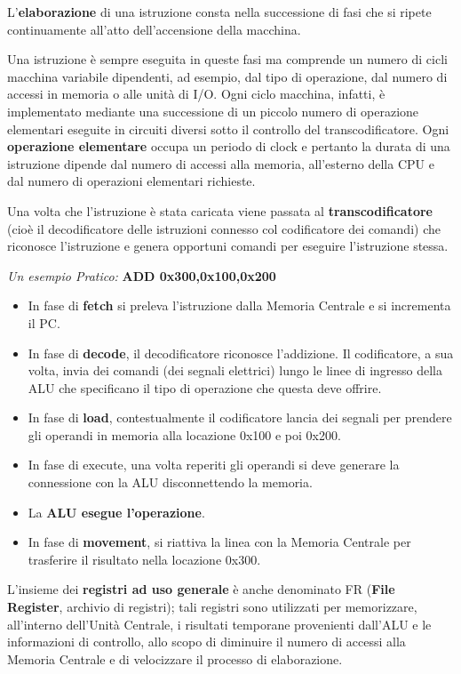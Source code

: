 \documentclass[12pt]{article} %
\begin{document}
L’\textbf{elaborazione} di una istruzione consta nella successione di fasi che si ripete continuamente all’atto dell’accensione della macchina.\par\medskip\noindent
Una istruzione è sempre eseguita in queste fasi ma comprende un numero di cicli macchina variabile dipendenti, ad esempio, dal tipo di operazione, dal numero di accessi in memoria o alle unità di I/O. Ogni ciclo macchina, infatti, è implementato mediante una successione di un piccolo numero di operazione elementari eseguite in circuiti diversi sotto il controllo del transcodificatore. Ogni \textbf{operazione elementare} occupa un periodo di clock e pertanto la durata di una istruzione dipende dal numero di accessi alla memoria, all’esterno della CPU e dal numero di operazioni elementari richieste. \par\medskip\noindent
Una volta che l’istruzione è stata caricata viene passata al \textbf{transcodificatore} (cioè il decodificatore delle istruzioni connesso col codificatore dei comandi) che riconosce l’istruzione e genera opportuni comandi per eseguire l’istruzione stessa.\par\medskip\noindent
\textit{Un esempio Pratico: }\textbf{ADD 0x300,0x100,0x200}
\begin{itemize}
    \item In fase di \textbf{fetch} si preleva l’istruzione dalla Memoria Centrale e si incrementa il PC.
    \item In fase di \textbf{decode}, il decodificatore riconosce l’addizione. Il codificatore, a sua volta, invia dei comandi (dei segnali elettrici) lungo le linee di ingresso della ALU che specificano il tipo di operazione che questa deve offrire.
    \item In fase di \textbf{load}, contestualmente il codificatore lancia dei segnali per prendere gli operandi in memoria alla locazione 0x100 e poi 0x200.
    \item In fase di execute, una volta reperiti gli operandi si deve generare la connessione con la ALU disconnettendo la memoria.
    \item La \textbf{ALU esegue l’operazione}.
    \item  In fase di \textbf{movement}, si riattiva la linea con la Memoria Centrale per trasferire il risultato nella locazione 0x300.\par\medskip\noindent
\end{itemize}
L’insieme dei \textbf{registri ad uso generale} è anche denominato FR (\textbf{File Register}, archivio di registri); tali registri sono utilizzati per memorizzare, all’interno dell’Unità Centrale, i risultati temporane provenienti dall’ALU e le informazioni di controllo, allo scopo di diminuire il numero di accessi alla Memoria Centrale e di velocizzare il processo di elaborazione.\par\medskip\noindent 
\end{document}
